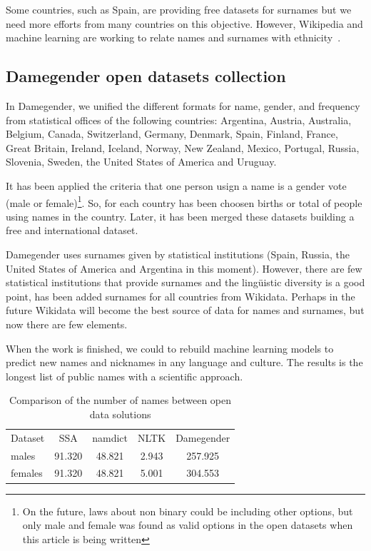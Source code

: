 \documentclass[a4paper]{article}
\begin{document}
Some countries, such as Spain, are providing free datasets for
surnames but we need more efforts from many countries on this
objective. However, Wikipedia and machine learning are working
to relate names and surnames with ethnicity~\cite{ambekar2009name}.

\subsection{Damegender open datasets collection}
\label{sec:damegender}

In Damegender, we unified the different formats for name, gender,
and frequency from statistical offices of the following countries:
Argentina, Austria, Australia, Belgium, Canada, Switzerland, Germany,
Denmark, Spain, Finland, France, Great Britain, Ireland, Iceland,
Norway, New Zealand, Mexico, Portugal, Russia, Slovenia, Sweden,
the United States of America and Uruguay.

It has been applied the criteria that one person usign a name is
a gender vote (male or female)\footnote{On the future, laws about
non binary could be including other options, but only male and
female was found as valid options in the open datasets when this
article is being written}. So, for each country has been choosen
births or total of people using names in the country. Later, it
has been merged these datasets building a free and international
dataset. 

Damegender uses surnames given by statistical institutions (Spain,
Russia, the United States of America and Argentina in this moment).
However, there are few statistical institutions that provide
surnames and the lingüistic diversity is a good point, has been
added surnames for all countries from Wikidata. Perhaps in the future
Wikidata will become the best source of data for names and surnames,
but now there are few elements.

When the work is finished, we could to rebuild machine learning models
to predict new names and nicknames in any language and culture. The
results is the longest list of public names with a scientific approach.

\begin{table}[t]
\footnotesize
\begin{tabular}[]{lcccc}
  \hline
  Dataset & SSA & namdict & NLTK & Damegender \tabularnewline
  males & 91.320 & 48.821 & 2.943 & 257.925 \tabularnewline
  females & 91.320 & 48.821 & 5.001 & 304.553 \tabularnewline
  \hline
\end{tabular}
\caption{Comparison of the number of names between open data solutions}
\label{table:DifferentNamesMeasures}
\end{table}
\end{document}
